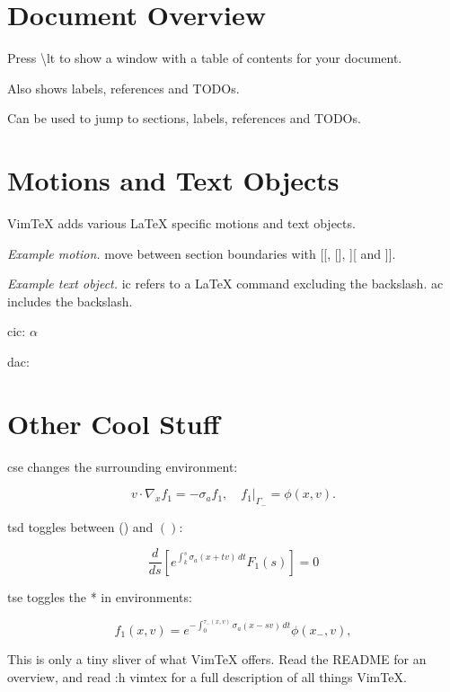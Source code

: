 \documentclass{article}
\newcommand{\lt}{\textbackslash{}lt }
\begin{document}
\section{Document Overview}

Press \lt to show a window with a table of contents for your document.

Also shows labels, references and TODOs.

Can be used to jump to sections, labels, references and TODOs.















\section{Motions and Text Objects}

VimTeX adds various LaTeX specific motions and text objects.

\emph{Example motion.} move between section boundaries with [[, [], ][ and ]].

\emph{Example text object.} ic refers to a LaTeX command excluding the
backslash. ac includes the backslash.

cic: \( \alpha \)

dac: \(  \)











\section{Other Cool Stuff}

cse changes the surrounding environment:

\begin{equation}
	v \cdot \nabla_x f_1 = -\sigma_a f_1, \quad f_1 \rvert_{\Gamma_-} = \phi(x,v).
\end{equation}

tsd toggles between () and \( \left( \right) \):

\begin{equation*}
	\frac{d}{ds} \left[ e^{\int_k^s \sigma_a(x + tv)\,dt} F_1(s) \right] = 0
\end{equation*}

tse toggles the * in environments:

\begin{equation}
	f_1(x, v) = e^{-\int_0^{\tau_-(x, v)} \sigma_a(x - sv)\,dt} \phi(x_-, v),
\end{equation}

This is only a tiny sliver of what VimTeX offers.
Read the README for an overview, and read :h vimtex for a full description of
all things VimTeX.
\end{document}
